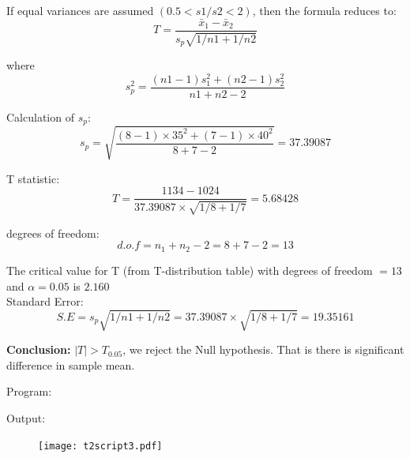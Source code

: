 \documentclass[a4paper,11pt,openright]{report}
\begin{document}
\begin{enumerate}
If equal variances are assumed $(0.5 < s1/s2 < 2)$, then the formula reduces to:
\begin{equation*}
T = \frac{\bar x_{1} - \bar x_{2}}{s_{p} \sqrt{1/n1 + 1/n2}}
\end{equation*}

where
\begin{equation*}
s_{p}^{2} = \frac{(n1-1)s_{1}^{2} + (n2-1)s_{2}^{2}}{n1+n2-2}
\end{equation*}

Calculation of $s_{p}$:
\begin{equation*}
s_{p} = \sqrt{\frac{(8-1) \times 35^{2} + (7-1) \times 40^{2}}{8+7-2}} 
      = 37.39087
\end{equation*}

T statistic:
\begin{equation*}
T = \frac{1134 - 1024}{37.39087 \times \sqrt{1/8 + 1/7}} = 5.68428
\end{equation*}

degrees of freedom:
\begin{equation*}
d.o.f = n_{1} + n_{2} - 2 = 8 + 7 - 2 = 13
\end{equation*}

The critical value for T (from T-distribution table) with degrees of freedom $= 13$ and 
$\alpha = 0.05$ is $2.160$ \\

Standard Error:
\begin{equation*}
S.E = s_{p} \sqrt{1/n1 + 1/n2} = 37.39087 \times \sqrt{1/8 + 1/7} = 19.35161
\end{equation*}

\textbf{Conclusion:} $|T| > T_{0.05}$, we reject the Null hypothesis. That is there is 
significant difference in sample mean.

\vspace{2cm}

Program:


\vspace{1cm}

Output:


\begin{figure}[ht!]
\texttt{[image: t2script3.pdf]}
\centering
\end{figure}


%
%
%
%
%
%

\end{enumerate}
\end{document}
